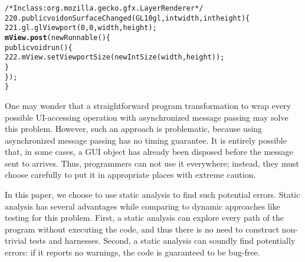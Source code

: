 \begin{CodeOut}
\begin{alltt}
     /* In class: org.mozilla.gecko.gfx.LayerRenderer */
220. public void onSurfaceChanged(GL10 gl, int width, int height) \{
221.     gl.glViewport(0, 0, width, height);
         \textbf{mView.post}(new Runnable() \{
             public void run() \{
222.             mView.setViewportSize(new IntSize(width, height));
             \}
         \});
     \}
\end{alltt}
\end{CodeOut}

One may wonder that a straightforward program transformation to wrap
every possible UI-accessing operation with asynchronized message passing
may solve this problem. However, such an approach is problematic,
because using asynchronized message passing has no timing
guarantee. It is entirely possible that, in some cases, a GUI object has already been
disposed before the message sent to arrives. Thus, programmers can not use
it everywhere; instead, they must choose carefully to put it in appropriate places
with extreme caution.


In this paper, we choose to use static analysis to find such potential errors.
Static analysis has several advantages while comparing to dynamic approaches like testing for this problem.
First, a static analysis can explore every path of the program without executing the code, and
thus there is no need to construct non-trivial tests and harnesses.
Second, a static analysis can soundly find potentially errors: if it
reports no warnings, the code is guaranteed to be bug-free. 


